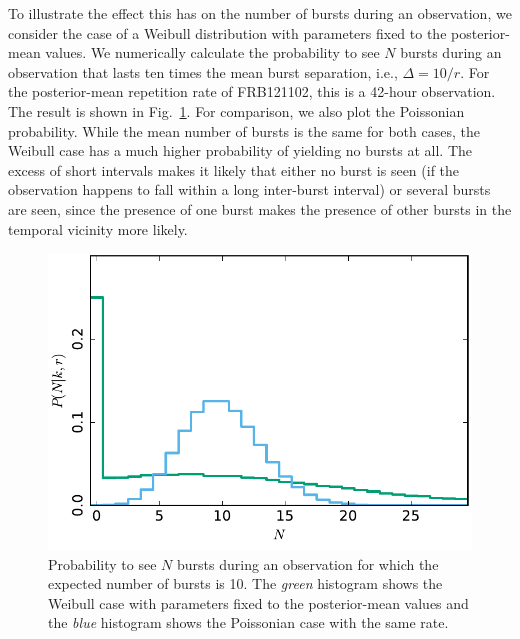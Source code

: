 \documentclass[fleqn,usenatbib]{mnras}
\newcommand{\new}[1]{#1}
\begin{document}
To illustrate the effect this has on the number of bursts during an observation, we consider the case of a Weibull distribution with parameters fixed to the posterior-mean values. We numerically calculate the probability to see $N$ bursts during an observation that lasts ten times the mean burst separation, i.e., $\Delta = 10/r$. \new{For the posterior-mean repetition rate of FRB121102, this is a 42-hour observation. The result} is shown in Fig.~\ref{fig:n_singleint}. For comparison, we also plot the Poissonian probability. While the mean number of bursts is the same for both cases, the Weibull case has a much higher probability of yielding no bursts at all. The excess of short intervals makes it likely that either no burst is seen (if the observation happens to fall within a long inter-burst interval) or several bursts are seen, since the presence of one burst makes the presence of other bursts in the temporal vicinity more likely.

\begin{figure}
	\includegraphics[width=1.0\columnwidth]{n_singleint.pdf}
	\caption{\label{fig:n_singleint}Probability to see $N$ bursts during an observation for which the expected number of bursts is 10. The \emph{green} histogram shows the Weibull case with parameters fixed to the posterior-mean values and the \emph{blue} histogram shows the Poissonian case with the same rate.}
\end{figure}
\end{document}
